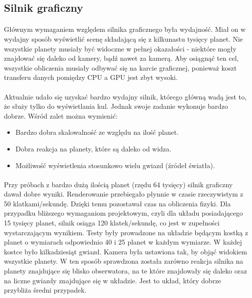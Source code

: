 \subsection{Silnik graficzny}\label{sub:silnik graficzny}
\paragraph{}

Głównym wymaganiem względem silnika graficznego była wydajność. Miał on w wydajny sposób wyświetlić scenę składającą się z kilkunastu tysięcy planet. Nie wszystkie planety musiały być widoczne w pełnej okazałości - niektóre mogły znajdować się daleko od kamery, bądź nawet za kamerą. Aby osiągnąć ten cel, wszystkie obliczenia musiały odbywać się na karcie graficznej, ponieważ koszt transferu danych pomiędzy CPU a GPU jest zbyt wysoki.

\paragraph{}

Aktualnie udało się uzyskać bardzo wydajny silnik, którego główną wadą jest to, że służy tylko do wyświetlania kul. Jednak swoje zadanie wykonuje bardzo dobrze. Wśród zalet można wymienić:

\begin{itemize}
\item Bardzo dobra skalowalność ze względu na ilość planet.
\item Dobra reakcja na planety, które są daleko od widza.
\item Możliwość wyświetlenia stosunkowo wielu gwiazd (źródeł światła).
\end{itemize}

\paragraph{}

Przy próbach z bardzo dużą ilością planet (rzędu 64 tysięcy) silnik graficzny dawał dobre wyniki. Renderowanie przebiegało płynnie w czasie rzeczywistym z 50 klatkami/sekundę. Dzięki temu pozostawał czas na obliczenia fizyki. Dla przypadku bliższego wymaganiom projektowym, czyli dla układu posiadającego 15 tysięcy planet, silnik osiąga 120 klatek/sekundę, co jest w zupełności wystarczającym wynikiem. Testy były prowadzone na układzie będącym kostką z planet o wymiarach odpowiednio 40 i 25 planet w każdym wymiarze. W każdej kostce było kilkadziesiąt gwiazd. Kamera była ustawiona tak, by objąć widokiem wszystkie planety. W ten sposób sprawdzona została zarówno reakcja silnika na planety znajdujące się blisko obserwatora, na te które znajdowały się daleko oraz na liczne gwiazdy znajdujące się w układzie. Jest to układ, który dobrze przybliża średni przypadek.

